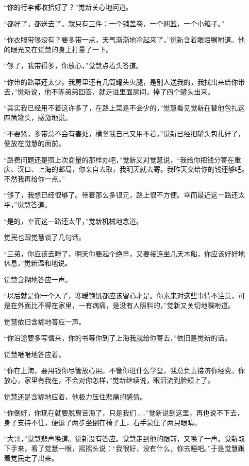\par “你的行李都收拾好了？”觉新关心地问道。
\par “都好了，都送去了。就只有三件：一个铺盖卷，一个网篮，一个小箱子。”
\par “你衣服带够没有？要多带一点，天气渐渐地冷起来了，”觉新含着眼泪嘱咐道。他的眼光又在觉慧的身上打量了一下。
\par “够了，我带得多，你放心，”觉慧点着头答道。
\par “你带的路菜还太少。我房里还有几筒罐头火腿，是别人送我的，我找出来给你带去，”觉新说，他不等弟弟回答，就走进里面房间，捧了四个罐头出来。
\par “其实我已经用不着这许多了，在路上菜是不会少的，”觉慧看见觉新在替他包扎这四筒罐头，感激地说。
\par “不要紧，多带总不会有害处，横竖我自己又用不着，”觉新已经把罐头包扎好了，便放在觉慧的面前。
\par “路费问题还是照上次商量的那样办吧，”觉新又对觉慧说，“我给你把钱分寄在重庆、汉口、上海的邮局，你亲自去取，我明天就去寄。我昨天交给你的钱还够吧。不然我再给你一点。”
\par “够了，我想已经很够了。带着那么多银元，路上很不方便。幸而最近这一路还太平，”觉慧答道。
\par “是的，幸而这一路还太平，”觉新机械地念道。
\par 觉民也跟觉慧谈了几句话。
\par “三弟，你应该去睡了，明天你要起个绝早，又要接连坐几天木船，你应该好好地休息，”觉新温和地说。
\par 觉慧含糊地答应一声。
\par “以后就是你一个人了，寒暖饱饥都应该留心才是。你素来对这些事情不注意，可是在外面比不得在家里，一有病痛，是没有人照料的，”觉新又关切地嘱咐道。
\par 觉慧依旧含糊地答应一声。
\par “你沿途要多写信来，你的书等你到了上海我就给你寄去，”依旧是觉新的话。
\par 觉慧唯唯地答应着。
\par “你在上海，要用钱你尽管放心用。不管你进什么学堂，我总负责接济你经费。你放心，家里有我在，不会对你怎样，”觉新继续说，眼泪流到脸颊上了。
\par 觉慧还是含糊地应着，他极力压住悲痛的感情。
\par “你倒好，你现在就要脱离苦海了，只是我们……”觉新说到这里，再也说不下去，身子支持不住，便退了两步坐倒在椅子上，右手蒙住了两只眼睛。
\par “大哥，”觉慧悲声唤道。觉新没有答应。觉慧走到他的跟前，又唤了一声。觉新取下手来，看了觉慧一眼，摇摇头说：“我很好，没有什么，你去睡吧。”于是觉慧跟着觉民走了出来。
